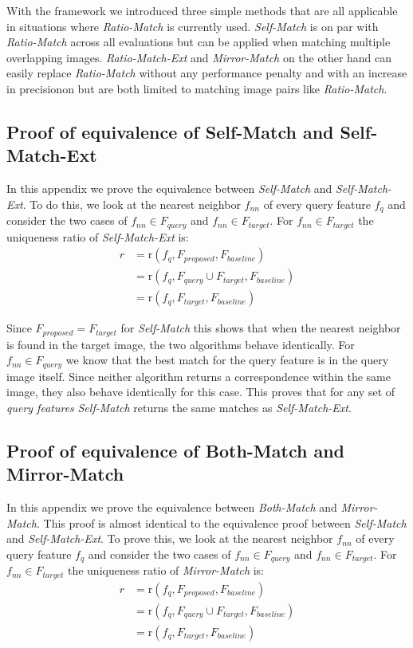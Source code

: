 \documentclass[journal]{IEEEtran}
\begin{document}
With the framework we introduced three simple methods that are all 
applicable in situations where \emph{Ratio-Match} is currently used.  
\emph{Self-Match} is on par with \emph{Ratio-Match} across all 
evaluations but can be applied when matching multiple overlapping 
images. \emph{Ratio-Match-Ext} and \emph{Mirror-Match} on the other hand 
can easily replace \emph{Ratio-Match} without any performance penalty 
and with an increase in precisionon but are both limited to matching 
image pairs like \emph{Ratio-Match}.

\appendix

\subsection{Proof of equivalence of Self-Match and Self-Match-Ext}
\label{A:self}

In this appendix we prove the equivalence between \emph{Self-Match} and 
\emph{Self-Match-Ext}. To do this, we look at the nearest neighbor 
$f_{nn}$ of every query feature $f_{q}$ and consider the two cases of 
$f_{nn} \in F_{query}$ and $f_{nn} \in
F_{target}$. For $f_{nn} \in F_{target}$ the uniqueness ratio of 
\emph{Self-Match-Ext} is:
\begin{align*}
    r &= \text{r}(f_{q}, F_{proposed}, F_{baseline}) \\
        &= \text{r}(f_{q}, F_{query} \cup F_{target}, F_{baseline})\\
        &= \text{r}(f_{q}, F_{target}, F_{baseline})
\end{align*}

Since $F_{proposed} = F_{target}$ for \emph{Self-Match} this shows that
when the nearest neighbor is found in the target image, the two 
algorithms behave identically. For $f_{nn} \in F_{query}$ we know that 
the best match for the query feature is in the query image itself. Since 
neither algorithm returns a correspondence within the same image, they 
also behave identically for this case. This proves that for any set of 
\emph{query features} \emph{Self-Match} returns the same matches as 
\emph{Self-Match-Ext}.

\subsection{Proof of equivalence of Both-Match and Mirror-Match}
\label{A:mirror}

In this appendix we prove the equivalence between \emph{Both-Match} and 
\emph{Mirror-Match}. This proof is almost identical to the equivalence 
proof between \emph{Self-Match} and \emph{Self-Match-Ext}. To prove 
this, we look at the nearest neighbor $f_{nn}$ of every query feature 
$f_{q}$ and consider the two cases of $f_{nn} \in F_{query}$ and $f_{nn} 
\in
F_{target}$. For $f_{nn} \in F_{target}$ the uniqueness ratio of 
\emph{Mirror-Match} is:
\begin{align*}
    r &= \text{r}(f_{q}, F_{proposed}, F_{baseline}) \\
        &= \text{r}(f_{q}, F_{query} \cup F_{target}, F_{baseline})\\
        &= \text{r}(f_{q}, F_{target}, F_{baseline})
\end{align*}
\end{document}
